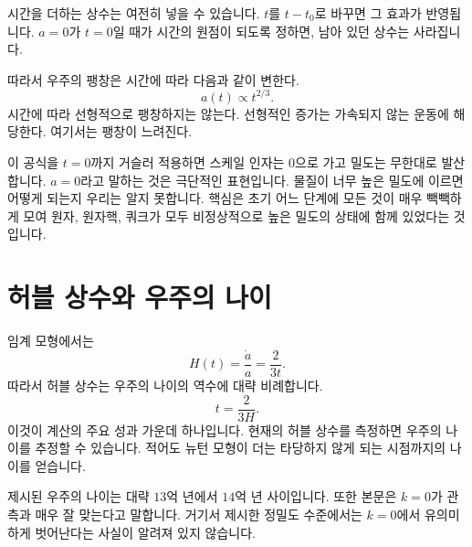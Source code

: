 시간을 더하는 상수는 여전히 넣을 수 있습니다. \(t\)를 \(t-t_0\)로 바꾸면 그 효과가 반영됩니다. \(a=0\)가 \(t=0\)일 때가 시간의 원점이 되도록 정하면, 남아 있던 상수는 사라집니다.

따라서 우주의 팽창은 시간에 따라 다음과 같이 변한다.
\begin{equation}
a(t)\propto t^{2/3}.
\end{equation}
시간에 따라 선형적으로 팽창하지는 않는다.
선형적인 증가는 가속되지 않는 운동에 해당한다.
여기서는 팽창이 느려진다.

이 공식을 \(t=0\)까지 거슬러 적용하면 스케일 인자는 0으로 가고 밀도는 무한대로 발산합니다. \(a=0\)라고 말하는 것은 극단적인 표현입니다. 물질이 너무 높은 밀도에 이르면 어떻게 되는지 우리는 알지 못합니다. 핵심은 초기 어느 단계에 모든 것이 매우 빽빽하게 모여 원자, 원자핵, 쿼크가 모두 비정상적으로 높은 밀도의 상태에 함께 있었다는 것입니다.

\section{허블 상수와 우주의 나이}

임계 모형에서는
\begin{equation}
H(t)=\frac{\dot a}{a}=\frac{2}{3t}.
\end{equation}
따라서 허블 상수는 우주의 나이의 역수에 대략 비례합니다.
\begin{equation}
t=\frac{2}{3H}.
\end{equation}
이것이 계산의 주요 성과 가운데 하나입니다. 현재의 허블 상수를 측정하면 우주의 나이를 추정할 수 있습니다. 적어도 뉴턴 모형이 더는 타당하지 않게 되는 시점까지의 나이를 얻습니다.

제시된 우주의 나이는 대략 \(13\)억 년에서 \(14\)억 년 사이입니다. 또한 본문은 \(k=0\)가 관측과 매우 잘 맞는다고 말합니다. 거기서 제시한 정밀도 수준에서는 \(k=0\)에서 유의미하게 벗어난다는 사실이 알려져 있지 않습니다.

\begin{classroomqa}
\end{classroomqa}

